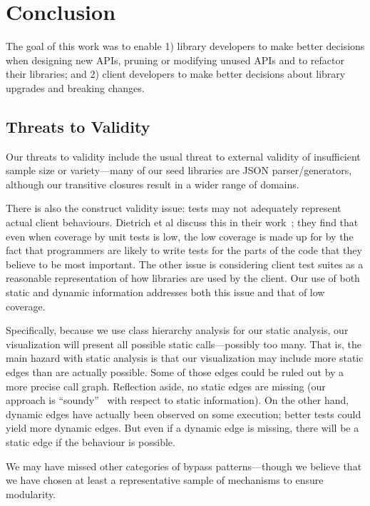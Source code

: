 \chapter{Conclusion}
\label{sec:conclusion}
The goal of this work was to enable 1) library developers to make better
decisions when designing new APIs, pruning or modifying unused APIs and to refactor their
libraries; and 2) client developers to make better decisions about library
upgrades and breaking changes.

\section{Threats to Validity}
Our threats to validity include the usual threat to external validity
of insufficient sample size or variety---many of our seed libraries
are JSON parser/generators, although our transitive closures result in
a wider range of domains.

There is also the construct validity issue: tests may
not adequately represent actual client behaviours. 
Dietrich et al discuss this in their work~\cite{dietrich2017construction}; 
they find that even when coverage by unit tests is low,
the low coverage is made up for by the fact that programmers are likely to write tests for the parts of the code
that they believe to be most important. 
The other issue is considering client test suites as a reasonable representation of how libraries are used by the client.
Our use of both static and dynamic information addresses both this issue and that of low coverage. 

Specifically, because we use
class hierarchy analysis for our static analysis, our visualization will present
all possible static calls---possibly too many. 
That is, the main hazard with static analysis is that our visualization may include more
static edges than are actually possible. Some of those edges could be ruled out by a more
precise call graph. Reflection aside, no static edges
are missing (our approach is ``soundy''~\cite{livshits15:_in_defen_sound} with respect to static information). 
On the other hand, dynamic edges have actually been observed
on some execution; better tests could yield more dynamic edges. But even if
a dynamic edge is missing, there will be a static edge if the behaviour is possible.

We may have missed other categories of bypass patterns---though we believe
that we have chosen at least a representative sample of mechanisms to ensure
modularity. 

